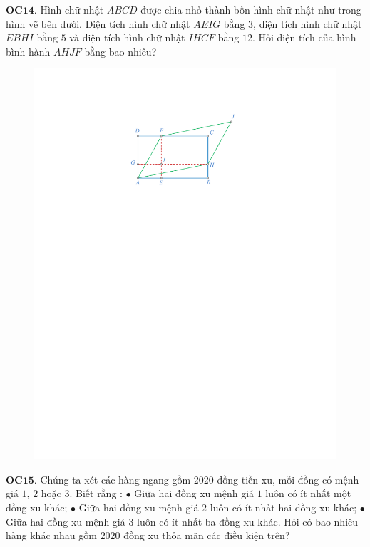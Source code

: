 \begin{multicols}{2}
	\vskip 0.1cm
	{\bf\color{cackithi} OC$\pmb{14.}$} Hình chữ nhật $ABCD$ được chia nhỏ thành bốn hình chữ nhật như trong hình vẽ bên dưới. Diện tích hình chữ nhật $AEIG$ bằng $3$, diện tích hình chữ nhật $EBHI$ bằng $5$ và diện tích hình chữ nhật $IHCF$ bằng $12$. Hỏi diện tích của hình bình hành $AHJF$ bằng bao nhiêu?
	\begin{figure}[H]
		\vspace*{-5pt}
		\centering
		\captionsetup{labelformat= empty, justification=centering}
		\includegraphics[width= 1\linewidth]{OC14}
		\vspace*{-15pt}
	\end{figure}
	{\bf\color{cackithi} OC$\pmb{15.}$} Chúng ta xét các hàng ngang gồm $2020$ đồng tiền xu, mỗi đồng có mệnh giá $1$, $2$ hoặc $3$. Biết rằng :
	\vskip 0.1cm
	$\bullet$ Giữa hai đồng xu mệnh giá $1$ luôn có ít nhất một đồng xu khác;
	\vskip 0.1cm
	$\bullet$ Giữa hai đồng xu mệnh giá $2$ luôn có ít nhất hai đồng xu khác;
	\vskip 0.1cm
	$\bullet$ Giữa hai đồng xu mệnh giá $3$ luôn có ít nhất ba đồng xu khác.
	\vskip 0.1cm
	Hỏi có bao nhiêu hàng khác nhau gồm $2020$ đồng xu thỏa mãn các điều kiện trên?
\end{multicols}

